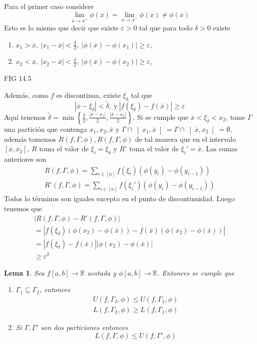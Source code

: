 \documentclass[12pt]{article}
\theoremstyle{plain}
\newtheorem{Lem}[Th]{Lema}             %
\theoremstyle{definition}
\theoremstyle{remark}
\numberwithin{equation}{section}
\newcommand{\bR}{\mathbb{R}}        %
\renewcommand{\geq}{\geqslant}      %
\renewcommand{\leq}{\leqslant}      %
\renewcommand{\:}{\colon}           %
\newcommand{\conj}[1]{\left\lbrace#1\right\rbrace}
\newcommand{\bonj}[1]{\left\lbrack#1\right\rbrack}
\newcommand{\obonj}[1]{\left\rbrack#1\right\lbrack}
\begin{document}
\begin{multicols}{2}
\begin{ptcbp}
Para el primer caso considere
$$\lim_{x\to\overline{x}^+}\phi(x)=\lim_{x\to\overline{x}^-}\phi(x)\neq\phi(\overline{x})$$
Esto es lo mismo que decir que existe $\varepsilon>0$ tal que para todo $\delta>0$ existe
\begin{enumerate}
  \item $x_1>\overline{x},\ |x_1-\overline{x}|<\frac{\delta}{2},\ |\phi(\overline{x})-\phi(x_1)|\geq \varepsilon$,
  \item $x_2<\overline{x},\ |x_2-\overline{x}|<\frac{\delta}{2},\ |\phi(\overline{x})-\phi(x_2)|\geq \varepsilon$,
\end{enumerate}
FIG 14.5\par
Además, como $f$ es discontinua, existe $\xi_\delta$ tal que
$$|\overline{x}-\xi_\delta|<\tilde{\delta},\ \text{y}\ |f(\xi_\delta)-f(\overline{x})|\geq\varepsilon$$
Aquí tenemos $\tilde{\delta}=\min\conj{\frac{\delta}{2},\frac{|\overline{x}-x_1|}{2},\frac{|\overline{x}-x_2|}{2}}$. Si se cumple que $\overline{x}<\xi_\delta<x_2$, tome $\Gamma$ una partición que contenga $x_1,x_2,\overline{x}$ y $\Gamma\cap\obonj{x_1,\overline{x}}=\Gamma\cap\obonj{\overline{x},x_2}=\emptyset$, además tomemos $R(f,\Gamma,\phi), R(f,\Gamma,\phi)$ de tal manera que en el intervalo $\bonj{\overline{x},x_2}$, $R$ toma el valor de $\xi_i=\xi_\delta$ y $R'$ toma el valor de $\xi_i'=\overline{x}$.
Las sumas anteriores son
\begin{gather*}
  R(f,\Gamma,\phi)=\sum_{i\in\bonj{n}}f(\xi_i)(\phi(y_i)-\phi(y_{i-1})) \\
  R'(f,\Gamma,\phi)=\sum_{i\in\bonj{n}}f(\xi_i')(\phi(y_i)-\phi(y_{i-1}))
\end{gather*}
Todos lo términos son iguales excepto en el punto de discontinuidad. Luego tenemos que
\begin{gather*}
  |R(f,\Gamma,\phi)-R'(f,\Gamma,\phi)|\\
  =|f(\xi_\delta)(\phi(x_2)-\phi(\overline{x}))-f(\overline{x})(\phi(x_2)-\phi(\overline{x}))|\\
 =|f(\xi_\delta)-f(\overline{x})| |\phi(x_2)-\phi(\overline{x})|\\
  \geq \varepsilon^2
\end{gather*}

\end{ptcbp}

\begin{Lem}
  Sea $f\bonj{a,b}\to\bR$ acotada y $\phi\bonj{a,b}\to\bR$. Entonces se cumple que
  \begin{enumerate}
    \item $\Gamma_1\subseteq\Gamma_2$, entonces
    \begin{gather*}
      U(f,\Gamma_2,\phi)\leq U(f,\Gamma_1,\phi)\\
      L(f,\Gamma_2,\phi)\geq L(f,\Gamma_1,\phi)
    \end{gather*}
    \item Si $\Gamma,\Gamma'$ son dos particiones entonces
    $$L(f,\Gamma,\phi)\leq U(f,\Gamma',\phi)$$
  \end{enumerate}
\end{Lem}


\end{multicols}
\end{document}
